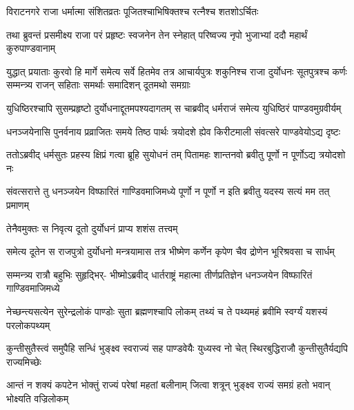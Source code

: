 \twolineshloka
{विराटनगरे राजा धर्मात्मा संशितव्रतः}
{पूजितश्चाभिषिक्तश्च रत्नैश्च शतशोऽर्चितः}


\fourlineindentedshloka
{तथा ब्रुवन्तं प्रसमीक्ष्य राजा}
{परं प्रहृष्टः स्वजनेन तेन}
{स्नेहात् परिष्वज्य नृपो भुजाभ्यां}
{ददौ महार्थं कुरुपाण्डवानाम्}


\sixlineindentedshloka
{युद्धात् प्रयाताः कुरवो हि मार्गे}
{समेत्य सर्वे हितमेव तत्र}
{आचार्यपुत्रः शकुनिश्च राजा}
{दुर्योधनः सूतपुत्रश्च कर्णः}
{सम्मन्त्र्य राजन् सहिताः समर्थाः}
{समादिशन् दूतमथो समग्राः}


\fourlineindentedshloka
{युधिष्ठिरश्चापि सुसम्प्रहृष्टो}
{दुर्योधनाद्दूतमपश्यदागतम्}
{स चाब्रवीद् धर्मराजं समेत्य}
{युधिष्ठिरं पाण्डवमुग्रवीर्यम्}


\fourlineindentedshloka
{धनञ्जयेनासि पुनर्वनाय}
{प्रव्राजितः समये तिष्ठ पार्थः}
{त्रयोदशे ह्येव किरीटमाली}
{संवत्सरे पाण्डवेयोऽद्य दृष्टः}



\fourlineindentedshloka
{ततोऽब्रवीद्  धर्मसुतः प्रहस्य}
{क्षिप्रं गत्वा ब्रूहि सुयोधनं तम्}
{पितामहः शान्तनवो ब्रवीतु}
{पूर्णो न पूर्णोऽद्य त्रयोदशो नः}


\fourlineindentedshloka
{संवत्सरात्ते तु धनञ्जयेन}
{विष्फारितं गाण्डिवमाजिमध्ये}
{पूर्णो न पूर्णो न इति ब्रवीतु}
{यदस्य सत्यं मम तत् प्रमाणम्}


\onelineindentedshloka
{तेनैवमुक्तः स निवृत्य दूतो}
{दुर्योधनं प्राप्य शशंस तत्त्वम्}

\fourlineindentedshloka
{समेत्य दूतेन स राजपुत्रो}
{दुर्योधनो मन्त्रयामास तत्र}
{भीष्मेण कर्णेन कृपेण चैव}
{द्रोणेन भूरिश्रवसा च सार्धम्}


\fourlineindentedshloka
{सम्मन्त्र्य रात्रौ बहुभिः सुहृद्भिर्-}
{भीष्मोऽब्रवीद्  धार्तराष्ट्रं महात्मा}
{तीर्णप्रतिज्ञेन धनञ्जयेन}
{विष्फारितं गाण्डिवमाजिमध्ये}



\fourlineindentedshloka
{नेच्छन्त्यसत्येन सुरेन्द्रलोकं}
{पाण्डोः सुता ब्रह्मणश्चापि लोकम्}
{तथ्यं च ते पथ्यमहं ब्रवीमि}
{स्वर्ग्यं यशस्यं परलोकपथ्यम्}


\fourlineindentedshloka
{कुन्तीसुतैस्त्वं समुपैहि सन्धिं}
{भुङ्क्ष्व स्वराज्यं सह पाण्डवेयैः}
{युध्यस्व नो चेत् स्थिरबुद्धिराजौ}
{कुन्तीसुतैर्यद्यपि राज्यमिच्छेः}


\fourlineindentedshloka
{आन्तं न शक्यं कपटेन भोक्तुं}
{राज्यं परेषां महतां बलीनाम्}
{जित्वा शत्रून् भुङ्क्ष्व राज्यं समग्रं}
{हतो भवान् भोक्ष्यति वज्रिलोकम्}



